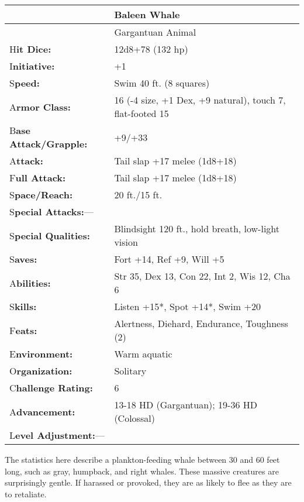 \documentclass{article}
\begin{document}
\vspace{12pt}
\begin{tabular}{|>{\raggedright}p{91pt}|>{\raggedright}p{221pt}|}
\hline
 & Baleen Whale\tabularnewline
\hline
 & Gargantuan Animal\tabularnewline
\hline
H\textbf{it Dice:} & 12d8+78 (132 hp)\tabularnewline
\hline
I\textbf{nitiative:} & +1\tabularnewline
\hline
S\textbf{peed:} & Swim 40 ft. (8 squares)\tabularnewline
\hline
A\textbf{rmor Class:} & 16 (-4 size, +1 Dex, +9 natural), touch 7, flat-footed 
15\tabularnewline
\hline
B\textbf{ase Attack/Grapple:} & +9/+33\tabularnewline
\hline
A\textbf{ttack:} & Tail slap +17 melee (1d8+18)\tabularnewline
\hline
F\textbf{ull Attack:} & Tail slap +17 melee (1d8+18)\tabularnewline
\hline
S\textbf{pace/Reach:} & 20 ft./15 ft.\tabularnewline
\hline
S\textbf{pecial Attacks:}--- & \tabularnewline
\hline
S\textbf{pecial Qualities:} & Blindsight 120 ft., hold breath, low-light vision\tabularnewline
\hline
S\textbf{aves:} & Fort +14, Ref +9, Will +5\tabularnewline
\hline
A\textbf{bilities:} & Str 35, Dex 13, Con 22, Int 2, Wis 12, Cha 6\tabularnewline
\hline
S\textbf{kills:} & Listen +15*, Spot +14*, Swim +20\tabularnewline
\hline
F\textbf{eats:} & Alertness, Diehard, Endurance, Toughness (2)\tabularnewline
\hline
E\textbf{nvironment:} & Warm aquatic\tabularnewline
\hline
O\textbf{rganization:} & Solitary\tabularnewline
\hline
C\textbf{hallenge Rating:} & 6\tabularnewline
\hline
A\textbf{dvancement:} & 13-18 HD (Gargantuan); 19-36 HD (Colossal)\tabularnewline
\hline
L\textbf{evel Adjustment:}--- & \tabularnewline
\hline
\end{tabular}

The statistics here describe a plankton-feeding whale between 30 and 60 feet long, 
such as gray, humpback, and right whales. These massive creatures are surprisingly 
gentle. If harassed or provoked, they are as likely to flee as they are to retaliate.
\end{document}
